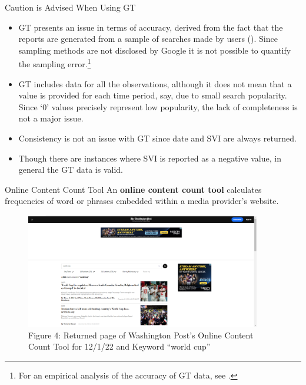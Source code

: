 \documentclass[pdf]{beamer}
\newcommand{\empr}[1]{{\color{franklinblue}\textbf{#1}}}
\theoremstyle{remark}
\theoremstyle{definition}
\begin{document}
\begin{frame}[t]{Caution is Advised When Using GT}
\small
\begin{itemize}
\item GT presents an issue in terms of accuracy, derived from the fact that the reports are generated from a sample of searches made by users (\cite{choi2012}). Since sampling methods are not disclosed by Google it is not possible to quantify the sampling error.\footnote{For an empirical analysis of the accuracy of GT data, see \cite{cebrian2022}.} 
\item GT includes data for all the observations, although it does not mean that a value is provided for each time period, say, due to small search popularity. Since `0' values precisely represent low popularity, the lack of completeness is not a major issue.  
\item Consistency is not an issue with GT since date and SVI are always returned.
\item Though there are instances where SVI is reported as a negative value, in general the GT data is valid.
\end{itemize}
\end{frame}

\begin{frame}[t]{Online Content Count Tool}
An \empr{online content count tool} calculates frequencies of word or phrases embedded within a media provider's website.
\begin{figure}[htbp]
  \captionsetup{justification=centering}
  \includegraphics[height=5.0cm, trim=0.0cm 0.0cm 0.0cm 0.0cm width=5.0cm]{Images/Wash_Post_Content_Tool_120122.png}
  \caption{Figure {\color{franklinblue} 4}: Returned page of Washington Post's Online Content  \\ Count Tool for 12/1/22 and Keyword ``world cup''}
\end{figure}
\end{frame}
\end{document}
